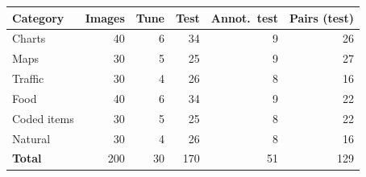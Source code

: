 \begin{tabular}{@{}lrrrrr@{}}
\toprule
Category & Images & Tune & Test & Annot.\ test & Pairs (test) \\
\midrule
Charts & 40 & 6 & 34 & 9 & 26 \\
Maps & 30 & 5 & 25 & 9 & 27 \\
Traffic & 30 & 4 & 26 & 8 & 16 \\
Food & 40 & 6 & 34 & 9 & 22 \\
Coded items & 30 & 5 & 25 & 8 & 22 \\
Natural & 30 & 4 & 26 & 8 & 16 \\
\midrule
\textbf{Total} & 200 & 30 & 170 & 51 & 129 \\
\bottomrule
\end{tabular}
